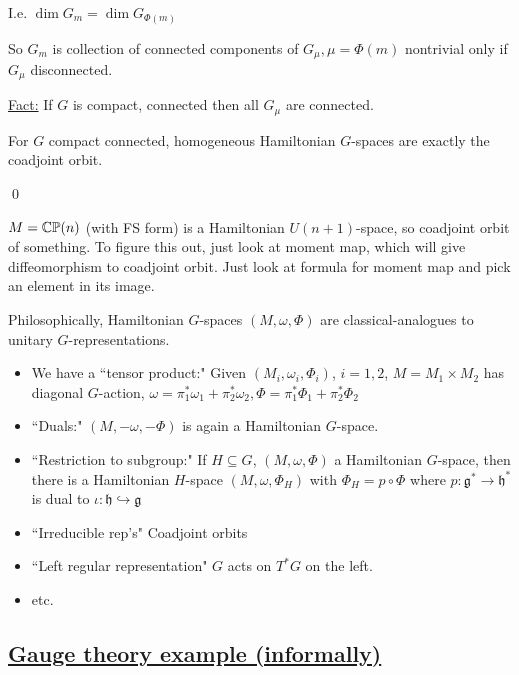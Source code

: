 \documentclass[x11names,reqno,14pt]{extarticle}
\newcommand{\mk}[1]{\mathfrak{#1}}
\newcommand{\g}{\mk{g}}
\newcommand{\h}{\mk{h}}
\newcommand{\into}{\hookrightarrow}
\begin{document}
I.e. $\dim G_m = \dim G_{\Phi(m)}$

So $G_m$ is collection of connected components of $G_\mu, \mu = \Phi(m)$ nontrivial only if $G_\mu$ disconnected.

\underline{Fact:} If $G$ is compact, connected then all $G_\mu$ are connected.

For $G$ compact connected, homogeneous Hamiltonian $G$-spaces are exactly the coadjoint orbit. 

\qed

\exm

$M = {\mathbb{CP}}(n)$ (with FS form) is a Hamiltonian $U(n+1)$-space, so coadjoint orbit of something. To figure this out, just look at moment map, which will give diffeomorphism to coadjoint orbit. Just look at formula for moment map and pick an element in its image. 

Philosophically, Hamiltonian $G$-spaces $(M,\omega,\Phi)$ are classical-analogues to unitary $G$-representations. 

\begin{itemize}

\item We have a ``tensor product:" Given $(M_i,\omega_i,\Phi_i)$, $i = 1, 2$, $M = M_1\times M_2$ has diagonal $G$-action, $\omega = \pi_1^*\omega_1 + \pi_2^*\omega_2, \Phi = \pi_1^*\Phi_1 + \pi_2^*\Phi_2$

\item ``Duals:" $(M,-\omega,-\Phi)$ is again a Hamiltonian $G$-space. 

\item ``Restriction to subgroup:" If $H \subseteq G$, $(M,\omega,\Phi)$ a Hamiltonian $G$-space, then there is a Hamiltonian $H$-space $(M,\omega,\Phi_H)$ with $\Phi_H = p\circ \Phi$ where $p:\g^*\to\h^*$ is dual to $\iota:\h\into\g$

\item ``Irreducible rep's" Coadjoint orbits

\item ``Left regular representation" $G$ acts on $T^*G$ on the left.

\item etc. 

\end{itemize}

\subsection*{\underline{Gauge theory example (informally)}}
\end{document}
